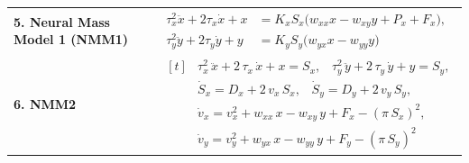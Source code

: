 \begin{landscape}
\begin{table}[p]
\begin{tabular}{@{}l  l@{}}
       \addlinespace[2ex]
        \textbf{5. Neural Mass Model 1 (NMM1)} \cite{molaee-ardekani_computational_2010} & $\displaystyle
          \begin{aligned}
            \tau_x^{2} \ddot{x} + 2\tau_x \dot{x} + x
              &= K_x S_x\bigl(w_{xx} x - w_{xy} y + P_x + F_x\bigr) ,\\
            \tau_y^{2} \ddot{y} + 2\tau_y \dot{y} + y
              &=  K_y S_y\bigl(w_{yx} x - w_{yy} y \bigr) 
          \end{aligned}$ \\[2ex]

\addlinespace[2ex]
      \textbf{6. NMM2} & $\displaystyle
        \begin{aligned}[t]
        &\tau_x^2\,\ddot x + 2\,\tau_x\,\dot x + x = S_x,\;\;\;
        \tau_y^2\,\ddot y + 2\,\tau_y\,\dot y + y = S_y, \\[6pt]
        &\dot S_x = D_x + 2\,v_x\,S_x,\;\;\;
        \dot S_y = D_y + 2\,v_y\,S_y, \\[6pt]
        &\dot v_x = v_x^2 + w_{xx}\,x - w_{xy}\,y + F_x - (\pi\,S_x)^2, \\[6pt]
        &\dot v_y = v_y^2 + w_{yx}\,x - w_{yy}\,y + F_y - (\pi\,S_y)^2
        \end{aligned}$

\\
        \bottomrule
    \end{tabular}
\end{table}
\end{landscape}



